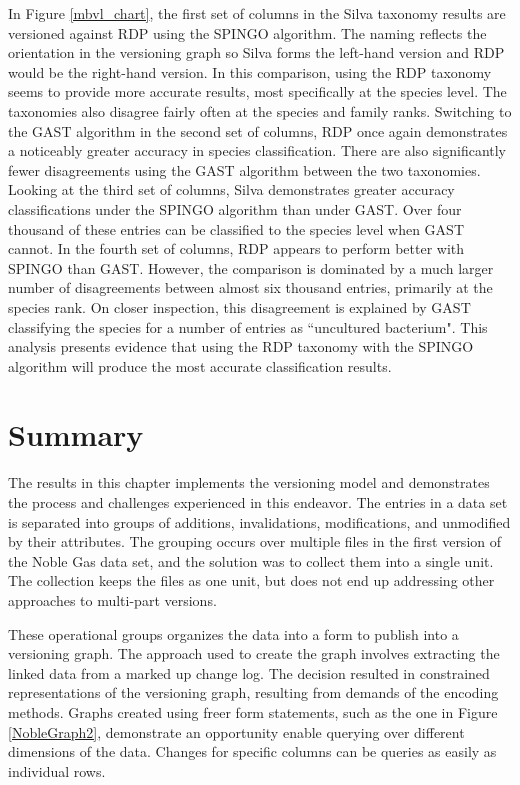 In Figure \ref{mbvl_chart}, the first set of columns in the Silva taxonomy results are versioned against RDP using the SPINGO algorithm.
The naming reflects the orientation in the versioning graph so Silva forms the left-hand version and RDP would be the right-hand version.
In this comparison, using the RDP taxonomy seems to provide more accurate results, most specifically at the species level.
The taxonomies also disagree fairly often at the species and family ranks.
Switching to the GAST algorithm in the second set of columns, RDP once again demonstrates a noticeably greater accuracy in species classification.
There are also significantly fewer disagreements using the GAST algorithm between the two taxonomies.
Looking at the third set of columns, Silva demonstrates greater accuracy classifications under the SPINGO algorithm than under GAST.
Over four thousand of these entries can be classified to the species level when GAST cannot.
In the fourth set of columns, RDP appears to perform better with SPINGO than GAST.
However, the comparison is dominated by a much larger number of disagreements between almost six thousand entries, primarily at the species rank.
On closer inspection, this disagreement is explained by GAST classifying the species for a number of entries as ``uncultured bacterium".
This analysis presents evidence that using the RDP taxonomy with the SPINGO algorithm will produce the most accurate classification results.

\section{Summary}

The results in this chapter implements the versioning model and demonstrates the process and challenges experienced in this endeavor.
The entries in a data set is separated into groups of additions, invalidations, modifications, and unmodified by their attributes.
The grouping occurs over multiple files in the first version of the Noble Gas data set, and the solution was to collect them into a single unit.
The collection keeps the files as one unit, but does not end up addressing other approaches to multi-part versions.

These operational groups organizes the data into a form to publish into a versioning graph.
The approach used to create the graph involves extracting the linked data from a marked up change log.
The decision resulted in constrained representations of the versioning graph, resulting from demands of the encoding methods.
Graphs created using freer form statements, such as the one in Figure \ref{NobleGraph2}, demonstrate an opportunity enable querying over different dimensions of the data.
Changes for specific columns can be queries as easily as individual rows.

